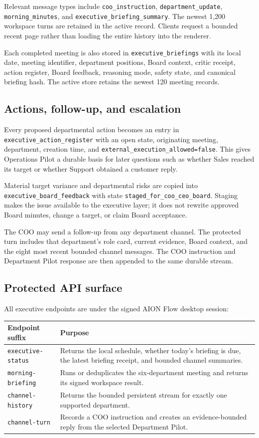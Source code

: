 Relevant message types include \texttt{coo\_instruction},
\texttt{department\_update}, \texttt{morning\_minutes}, and
\texttt{executive\_briefing\_summary}.  The newest 1,200 workspace turns are retained in the active
record.  Clients request a bounded recent page rather than loading the entire history into the
renderer.

Each completed meeting is also stored in \texttt{executive\_briefings} with its local date,
meeting identifier, department positions, Board context, critic receipt, action register, Board
feedback, reasoning mode, safety state, and canonical briefing hash.  The active store retains the
newest 120 meeting records.

\subsection{Actions, follow-up, and escalation}

Every proposed departmental action becomes an entry in
\texttt{executive\_action\_register} with an open state, originating meeting, department, creation
time, and \texttt{external\_execution\_allowed=false}.  This gives Operations Pilot a durable basis
for later questions such as whether Sales reached its target or whether Support obtained a customer
reply.

Material target variance and departmental risks are copied into
\texttt{executive\_board\_feedback} with state
\texttt{staged\_for\_coo\_ceo\_board}.  Staging makes the issue available to the executive layer; it
does not rewrite approved Board minutes, change a target, or claim Board acceptance.

The COO may send a follow-up from any department channel.  The protected turn includes that
department's role card, current evidence, Board context, and the eight most recent bounded channel
messages.  The COO instruction and Department Pilot response are then appended to the same durable
stream.

\subsection{Protected API surface}

All executive endpoints are under the signed AION Flow desktop session:
\begin{longtable}{p{.30\linewidth}p{.64\linewidth}}
\textbf{Endpoint suffix} & \textbf{Purpose}\\ \hline
\texttt{executive-status} & Returns the local schedule, whether today's briefing is due, the latest
briefing receipt, and bounded channel summaries.\\
\texttt{morning-briefing} & Runs or deduplicates the six-department meeting and returns its signed
workspace result.\\
\texttt{channel-history} & Returns the bounded persistent stream for exactly one supported
department.\\
\texttt{channel-turn} & Records a COO instruction and creates an evidence-bounded reply from the
selected Department Pilot.\\
\end{longtable}

